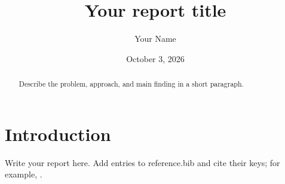 \documentclass{tempusreport}
\title{Your report title}
\author{Your Name}
\date{October 3, 2026}
\begin{document}
\maketitle
\begin{abstract}
Describe the problem, approach, and main finding in a short paragraph.
\end{abstract}
\section{Introduction}
Write your report here. Add entries to reference.bib and cite their keys;
for example, \citet{vaswani2017attention}.


\end{document}
